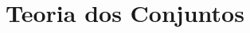 \documentclass[../../main]{subfiles}
\begin{document}
\chapter{Teoria dos Conjuntos}
\label{chap:teoria-conjuntos}





\end{document}
